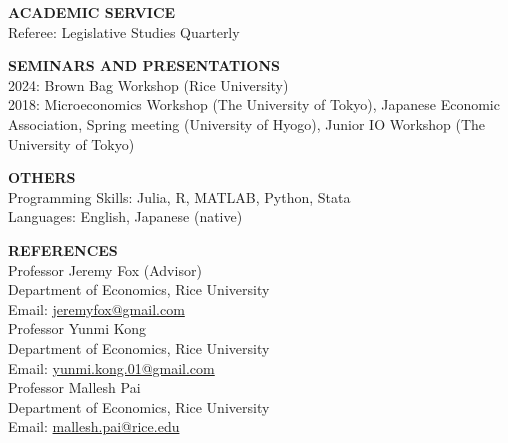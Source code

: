 \documentclass[10pt]{article}
\begin{document}
\vspace{10pt}

\textbf{ACADEMIC SERVICE} \\
Referee: Legislative Studies Quarterly

\vspace{10pt}

\textbf{SEMINARS AND PRESENTATIONS} \\
2024: Brown Bag Workshop (Rice University) \\
2018: Microeconomics Workshop (The University of Tokyo), Japanese Economic Association, Spring meeting (University of Hyogo), Junior IO Workshop (The University of Tokyo)

\vspace{10pt}

\textbf{OTHERS} \\
Programming Skills: Julia, R, MATLAB, Python, Stata \\
Languages: English, Japanese (native)

\vspace{10pt}

\textbf{REFERENCES} \\
Professor Jeremy Fox (Advisor) \\
Department of Economics, Rice University \\
Email: \href{mailto:jeremyfox@gmail.com}{jeremyfox@gmail.com} \\

Professor Yunmi Kong \\
Department of Economics, Rice University \\
Email: \href{mailto:yunmi.kong.01@gmail.com}{yunmi.kong.01@gmail.com} \\

Professor Mallesh Pai \\
Department of Economics, Rice University \\
Email: \href{mailto:mallesh.pai@rice.edu}{mallesh.pai@rice.edu}
\end{document}
